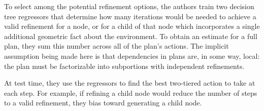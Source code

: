 To select among the potential refinement options, the authors train two decision tree regressors
that determine how many iterations would be needed to achieve a valid refinement for a node, or for a child
of that node which incorporates a single additional geometric fact about the environment.
To obtain an estimate for a full plan, they sum this number across all of the plan's actions.
The implicit assumption being made here is that dependencies in plans are, in some way, local:
the plan must be factorizable into subportions with independent refinements.

At test time, they use the regressors to find the best two-tiered action to take at each step.
For example, if refining a child node would reduce the number of steps to a valid refinement,
they bias toward generating a child node.